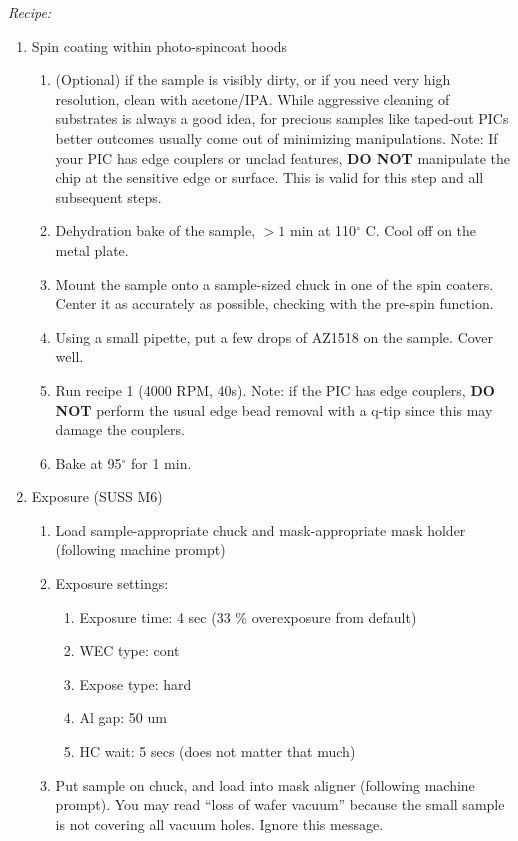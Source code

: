 \textit{Recipe:}
\begin{enumerate}
    \item Spin coating within photo-spincoat hoods
    \begin{enumerate}
        \item (Optional) if the sample is visibly dirty, or if you need very high resolution, clean with acetone/IPA. While aggressive cleaning of substrates is always a good idea, for precious samples like taped-out PICs better outcomes usually come out of minimizing manipulations. Note: If your PIC has edge couplers or unclad features, \textbf{DO NOT} manipulate the chip at the sensitive edge or surface. This is valid for this step and all subsequent steps.
        \item Dehydration bake of the sample, $> 1$ min at 110$^\circ$ C. Cool off on the metal plate. 
        \item Mount the sample onto a sample-sized chuck in one of the spin coaters. Center it as accurately as possible, checking with the pre-spin function. 
        \item Using a small pipette, put a few drops of AZ1518 on the sample. Cover well.
        \item Run recipe 1 (4000 RPM, 40s). Note: if the PIC has edge couplers, \textbf{DO NOT} perform the usual edge bead removal with a q-tip since this may damage the couplers.
        \item Bake at 95$^\circ$ for 1 min.
    \end{enumerate}
    \item Exposure (SUSS M6) 
    \begin{enumerate}
        \item Load sample-appropriate chuck and mask-appropriate mask holder (following machine prompt) 
        \item Exposure settings: 
        \begin{enumerate}
            \item Exposure time: 4 sec (33 \% overexposure from default) 
            \item WEC type: cont 
            \item Expose type: hard 
            \item Al gap: 50 um 
            \item HC wait: 5 secs (does not matter that much) 
        \end{enumerate}
        \item Put sample on chuck, and load into mask aligner (following machine prompt). You may read “loss of wafer vacuum” because the small sample is not covering all vacuum holes. Ignore this message. 

\end{enumerate}
\end{enumerate}
